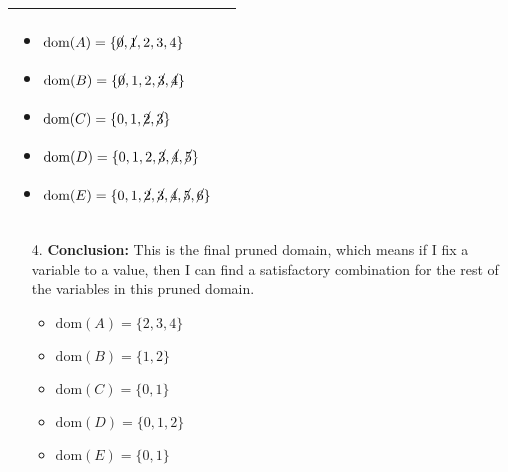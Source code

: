 \begin{example}
\begin{center}
\begin{tabular}{ll}
{            \begin{itemize}
                \item $\text{dom}(A) = \{\cancel{0}, \cancel{1}, 2, 3, 4\}$
                \item $\text{dom}(B) = \{\cancel{0}, 1, 2, \cancel{3}, \cancel{4}\} $
                \item $\text{dom}(C) = \{0, 1, \cancel{2}, \cancel{3}\} $
                \item $\text{dom}(D) = \{0, 1, 2, \cancel{3}, \cancel{4}, \cancel{5}\} $
                \item $\text{dom}(E) = \{0, 1, \cancel{2}, \cancel{3}, \cancel{4}, \cancel{5}, \cancel{6}\} $
            \end{itemize}} \\
            \bottomrule
        \end{tabular}
        \vspace{1em}

        \begin{enumerate}
            \item[4. ] \textbf{Conclusion:} This is the final pruned domain, which means if I fix a variable to a value, then I can find a satisfactory combination for the rest of the variables in this pruned domain.
            \begin{itemize}
                \item $\text{dom}(A) = \{2, 3, 4\}$
                \item $\text{dom}(B) = \{1, 2\} $
                \item $\text{dom}(C) = \{0, 1\} $
                \item $\text{dom}(D) = \{0, 1, 2\} $
                \item $\text{dom}(E) = \{0, 1\} $
            \end{itemize}
        \end{enumerate}
    \end{center}
\end{example}
\newpage

